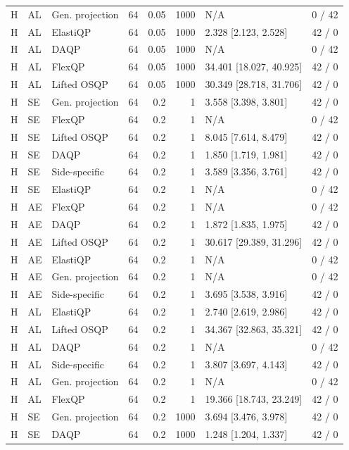 \begin{longtable}{@{}lllrrrlr@{}}
H & AL & Gen. projection & 64 & 0.05 & 1000 & N/A & 0 / 42 \\
H & AL & ElastiQP & 64 & 0.05 & 1000 & 2.328 [2.123, 2.528] & 42 / 0 \\
H & AL & DAQP & 64 & 0.05 & 1000 & N/A & 0 / 42 \\
H & AL & FlexQP & 64 & 0.05 & 1000 & 34.401 [18.027, 40.925] & 42 / 0 \\
H & AL & Lifted OSQP & 64 & 0.05 & 1000 & 30.349 [28.718, 31.706] & 42 / 0 \\
H & SE & Gen. projection & 64 & 0.2 & 1 & 3.558 [3.398, 3.801] & 42 / 0 \\
H & SE & FlexQP & 64 & 0.2 & 1 & N/A & 0 / 42 \\
H & SE & Lifted OSQP & 64 & 0.2 & 1 & 8.045 [7.614, 8.479] & 42 / 0 \\
H & SE & DAQP & 64 & 0.2 & 1 & 1.850 [1.719, 1.981] & 42 / 0 \\
H & SE & Side-specific & 64 & 0.2 & 1 & 3.589 [3.356, 3.761] & 42 / 0 \\
H & SE & ElastiQP & 64 & 0.2 & 1 & N/A & 0 / 42 \\
H & AE & FlexQP & 64 & 0.2 & 1 & N/A & 0 / 42 \\
H & AE & DAQP & 64 & 0.2 & 1 & 1.872 [1.835, 1.975] & 42 / 0 \\
H & AE & Lifted OSQP & 64 & 0.2 & 1 & 30.617 [29.389, 31.296] & 42 / 0 \\
H & AE & ElastiQP & 64 & 0.2 & 1 & N/A & 0 / 42 \\
H & AE & Gen. projection & 64 & 0.2 & 1 & N/A & 0 / 42 \\
H & AE & Side-specific & 64 & 0.2 & 1 & 3.695 [3.538, 3.916] & 42 / 0 \\
H & AL & ElastiQP & 64 & 0.2 & 1 & 2.740 [2.619, 2.986] & 42 / 0 \\
H & AL & Lifted OSQP & 64 & 0.2 & 1 & 34.367 [32.863, 35.321] & 42 / 0 \\
H & AL & DAQP & 64 & 0.2 & 1 & N/A & 0 / 42 \\
H & AL & Side-specific & 64 & 0.2 & 1 & 3.807 [3.697, 4.143] & 42 / 0 \\
H & AL & Gen. projection & 64 & 0.2 & 1 & N/A & 0 / 42 \\
H & AL & FlexQP & 64 & 0.2 & 1 & 19.366 [18.743, 23.249] & 42 / 0 \\
H & SE & Gen. projection & 64 & 0.2 & 1000 & 3.694 [3.476, 3.978] & 42 / 0 \\
H & SE & DAQP & 64 & 0.2 & 1000 & 1.248 [1.204, 1.337] & 42 / 0 \\

\end{longtable}
